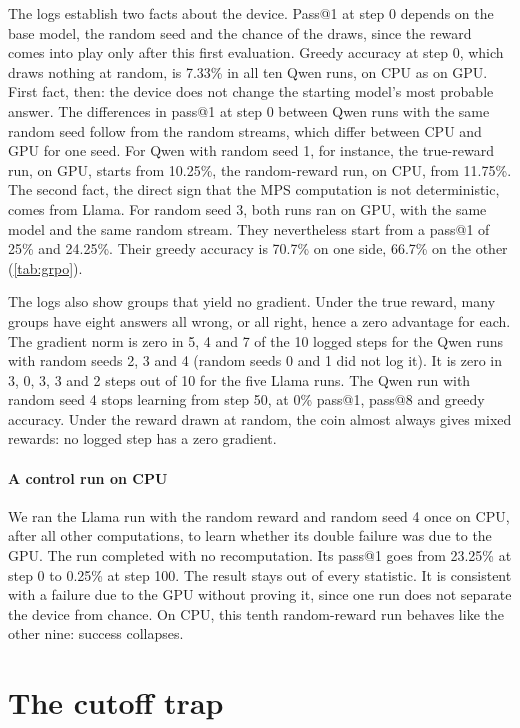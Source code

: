 The logs establish two facts about the device. Pass@1 at step 0 depends on the
base model, the random seed and the chance of the draws, since the reward comes into play only after
this first evaluation. Greedy accuracy at step 0, which draws nothing at random, is \num{7.33}\% in all
ten Qwen runs, on CPU as on GPU. First fact, then: the device does not change the starting model's most
probable answer. The differences in pass@1 at step 0 between Qwen runs with the same random seed follow from
the random streams, which differ between CPU and GPU for one seed. For Qwen with random seed 1, for instance,
the true-reward run, on GPU, starts from \num{10.25}\%, the random-reward run, on CPU, from \num{11.75}\%.
The second fact, the direct sign that the MPS computation is not deterministic, comes from Llama. For random
seed 3, both runs ran on GPU, with the same model and the same random stream. They nevertheless start from a
pass@1 of 25\% and \num{24.25}\%. Their greedy accuracy is \num{70.7}\% on one side, \num{66.7}\% on the
other (\cref{tab:grpo}).

The logs also show groups that yield no gradient. Under the true reward, many groups have eight answers
all wrong, or all right, hence a zero advantage for each. The gradient norm is zero in 5, 4 and 7 of the
10 logged steps for the Qwen runs with random seeds 2, 3 and 4 (random seeds 0 and 1 did not log it). It is
zero in 3, 0, 3, 3 and 2 steps out of 10 for the five Llama runs. The Qwen run with random seed 4 stops
learning from step 50, at 0\% pass@1, pass@8 and greedy accuracy. Under the reward drawn at random, the
coin almost always gives mixed rewards: no logged step has a zero gradient.

\paragraph{A control run on CPU} We ran the Llama run with the random reward and random seed 4 once on CPU,
after all other computations, to learn whether its double failure was due to the GPU. The run completed with no recomputation. Its pass@1
goes from \num{23.25}\% at step 0 to \num{0.25}\% at step 100. The result stays out of every
statistic. It is consistent with a failure due to the GPU without proving
it, since one run does not separate the device from chance. On CPU, this tenth random-reward
run behaves like the other nine: success collapses.

\section{The cutoff trap}
\label{sec:llm-coupure}

